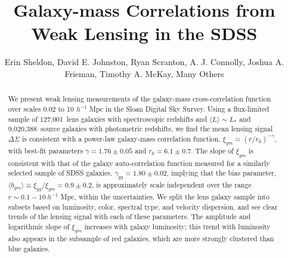 \documentclass{emulateapj}
\newcommand{\numspec}{127,001}
\newcommand{\numsource}{9,020,388}
\begin{document}
\title{Galaxy-mass Correlations from Weak Lensing in the SDSS}

\author{
Erin Sheldon,
David E. Johnston,
Ryan Scranton,
A. J. Connolly,
Joshua A. Frieman,
Timothy A. McKay,
Many Others
}


\begin{abstract}
We present weak lensing measurements of the galaxy-mass
cross-correlation function over scales 0.02 to 10 $h^{-1}$ Mpc in the Sloan Digital
Sky Survey. Using a flux-limited sample of \numspec\ lens galaxies with 
spectroscopic redshifts and $\langle L\rangle \sim L_*$ and 
\numsource\ source galaxies with photometric redshifts, we find 
the mean lensing signal $\Delta \Sigma$ 
is consistent with a power-law 
galaxy-mass correlation function, $\xi_{gm} = (r/r_0)^{-\gamma}$, 
with best-fit parameters $\gamma
= 1.76 \pm 0.05$ and $r_0 = 6.1 \pm 0.7$.  The slope of $\xi_{gm}$ is
consistent with that of the galaxy auto-correlation function 
measured for a similarly selected sample of SDSS galaxies, 
$\gamma_{gg} = 1.80 \pm 0.02$, implying that the
bias parameter, $\langle b_{gm}\rangle 
\equiv \xi_{gg}/\xi_{gm} = 0.9 \pm 0.2$, 
is approximately scale independent 
over the range $r \sim 0.1 - 10 ~ h^{-1}$ Mpc, within the 
uncertainties.  We split the lens galaxy 
sample into subsets based on luminosity, color, spectral
type, and velocity dispersion, and see clear trends of the lensing 
signal with each of these parameters. The amplitude and logarithmic 
slope of $\xi_{gm}$ increases with galaxy luminosity; this trend with 
luminosity also appears in the subsample of red galaxies, which are 
more strongly clustered than blue galaxies. 
\end{abstract}

\end{document}
